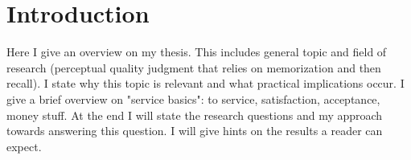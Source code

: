 \chapter{Introduction}\label{chap:01}
\begin{chapter-abstract}
Here I give an overview on my thesis.
This includes general topic and field of research (perceptual quality judgment that relies on memorization and then recall).
I state why this topic is relevant and what practical implications occur.
I give a brief overview on "service basics": to service, satisfaction, acceptance, money stuff.
At the end I will state the research questions and my approach towards answering this question.
I will give hints on the results a reader can expect.
\end{chapter-abstract}




